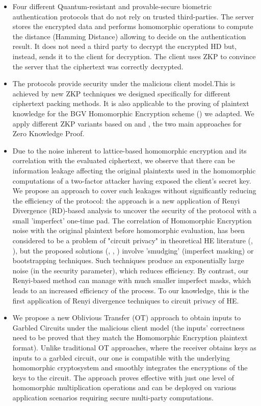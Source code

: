 \begin{itemize}
\item Four different Quantum-resistant and provable-secure biometric authentication protocols
  that do not rely on trusted third-parties. The server stores the encrypted data and performs
  homomorphic operations to compute the distance (Hamming Distance) allowing to decide on the
  authentication result. It does not need a third party to decrypt the encrypted
  HD but, instead, sends it to the client for decryption. The client uses ZKP to
  convince the server that the ciphertext was correctly decrypted.
\item The protocols provide security under the malicious client model.This is achieved
  by new ZKP techniques we designed specifically for different ciphertext
  packing methods. It is also applicable to the proving of plaintext knowledge for
  the BGV Homomorphic Encryption scheme (\cite{brakerski2011fully}) we
  adapted. We apply different ZKP variants based on \cite{stern1993new} and
  \cite{schnorr1989efficient}, the two main approaches for Zero
  Knowledge Proof.
\item Due to the noise inherent to lattice-based homomorphic encryption and
  its correlation with the evaluated ciphertext, we observe that there can be
  information leakage affecting the original plaintexts used in the homomorphic
  computations of a two-factor attacker having exposed the client's secret key. We
  propose an approach to cover such leakages without significantly reducing the
  efficiency of the protocol: the approach is a new application of Renyi
  Divergence (RD)-based analysis to uncover the security of the protocol with a
  small 'imperfect' one-time pad. The correlation of
  Homomorphic Encryption noise with the original plaintext before homomorphic
  evaluation, has been considered to be a problem of "circuit privacy" in theoretical HE
  literature (\cite{sander1999non}, \cite{ishai2007evaluating}), but the
  proposed solutions (\cite{homenc}, \cite{ostrovsky2014maliciously},
  \cite{gentry2010hop}) involve 'smudging' (imperfect masking) or bootstrapping
  techniques. Such techniques produce an exponentially large noise (in the security parameter), which
  reduces efficiency. By contrast, our Renyi-based method can manage with much smaller
  imperfect masks, which leads to an increased efficiency of the process. To our knowledge, this is the first application of
  Renyi divergence techniques to circuit privacy of HE.
\item We propose a new Oblivious Transfer (OT) approach to obtain inputs to
  Garbled Circuits under the malicious client model (the inputs' correctness need to be proved that they match the Homomorphic Encryption plaintext format). Unlike traditional OT approaches, where the receiver obtains
  keys as inputs to a garbled circuit, our one is compatible with the
  underlying homomorphic cryptosystem and smoothly integrates the encryptions of the
  keys to the circuit. The approach proves effective with just one level of
  homomorphic multiplication operations and can be deployed on various application
  scenarios requiring secure multi-party computations.
\end{itemize}

